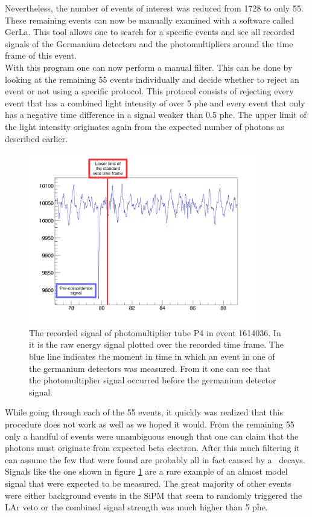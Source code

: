 Nevertheless, the number of events of interest was reduced from 1728 to only 55.  
These remaining events can now be manually examined with a software called GerLa.
This tool allows one to search for a specific events and see all recorded signals of the Germanium detectors and the photomultipliers around the time frame of this event.
\\

With this program one can now perform a manual filter.
This can be done by looking at the remaining 55 events individually and decide whether to reject an event or not using a specific protocol.
This protocol consists of rejecting every event that has a combined light intensity of over 5 phe and every event that only has a negative time difference in a signal weaker than 0.5 phe.
The upper limit of the light intensity originates again from the expected number of photons as described earlier.
\\

\begin{figure}[t!]
	\centering
	\ifmakefigures%
	\includegraphics[width=100mm]{./Bilder/BeispielSignal.pdf}
	\fi%

	\caption{
    The recorded signal of photomultiplier tube P4 in event 1614036. 
    In it is the raw energy signal plotted over the recorded time frame. 
    The blue line indicates the moment in time in which an event in one of the germanium detectors was measured. 
    From it one can see that the photomultiplier signal occurred before the germanium detector signal.   
    }
    	\label{fig:BeispielSignal}
\end{figure}

While going through each of the 55 events, it quickly was realized that this procedure does not work as well as we hoped it would.
From the remaining 55 only a handful of events were unambiguous enough that one can claim that the photons must originate from expected beta electron.
After this much filtering it can assume the few that were found are probably all in fact caused by a \Kr\ decays.
Signals like the one shown in figure \ref{fig:BeispielSignal} are a rare example of an almost model signal that were expected to be measured.
The great majority of other events were either background events in the SiPM that seem to randomly triggered the LAr veto or the combined signal strength was much higher than 5 phe.\\


